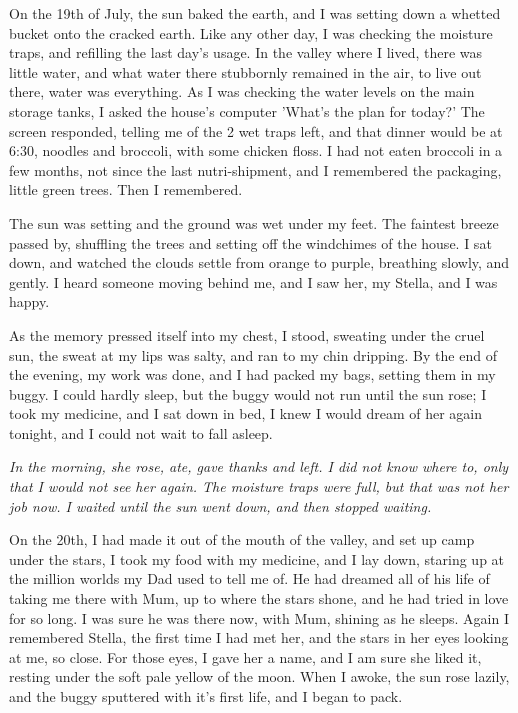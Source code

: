On the 19th of July, the sun baked the earth, and I was setting down a whetted bucket onto the cracked earth. Like any other day, I was checking the moisture traps, and refilling the last day's usage. In the valley where I lived, there was little water, and what water there stubbornly remained in the air, to live out there, water was everything. As I was checking the water levels on the main storage tanks, I asked the house's computer 'What's the plan for today?' The screen responded, telling me of the 2 wet traps left, and that dinner would be at 6:30, noodles and broccoli, with some chicken floss. I had not eaten broccoli in a few months, not since the last nutri-shipment, and I remembered the packaging, little green trees. Then I remembered.

The sun was setting and the ground was wet under my feet. The faintest breeze passed by, shuffling the trees and setting off the windchimes of the house. I sat down, and watched the clouds settle from orange to purple, breathing slowly, and gently. I heard someone moving behind me, and I saw her, my Stella, and I was happy.

As the memory pressed itself into my chest, I stood, sweating under the cruel sun, the sweat at my lips was salty, and ran to my chin dripping. By the end of the evening, my work was done, and I had packed my bags, setting them in my buggy. I could hardly sleep, but the buggy would not run until the sun rose; I took my medicine, and I sat down in bed, I knew I would dream of her again tonight, and I could not wait to fall asleep.


\emph{In the morning, she rose, ate, gave thanks and left. I did not know where to, only that I would not see her again. The moisture traps were full, but that was not her job now. I waited until the sun went down, and then stopped waiting.}


On the 20th, I had made it out of the mouth of the valley, and set up camp under the stars, I took my food with my medicine, and I lay down, staring up at the million worlds my Dad used to tell me of. He had dreamed all of his life of taking me there with Mum, up to where the stars shone, and he had tried in love for so long. I was sure he was there now, with Mum, shining as he sleeps. Again I remembered Stella, the first time I had met her, and the stars in her eyes looking at me, so close. For those eyes, I gave her a name, and I am sure she liked it, resting under the soft pale yellow of the moon. When I awoke, the sun rose lazily, and the buggy sputtered with it's first life, and I began to pack.

